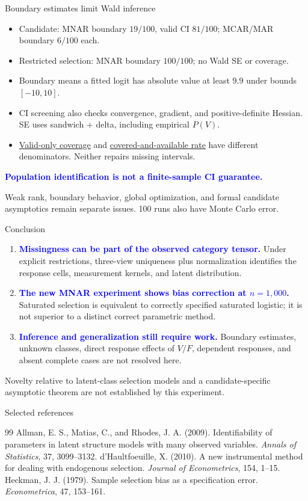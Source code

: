 \documentclass[aspectratio=169,10pt]{beamer}
\newcommand{\slidebody}{\fontsize{10.6pt}{12.6pt}\selectfont}
\renewcommand{\footnotesize}{\slidebody}
\newcommand{\bluekey}[1]{\textcolor{Blue}{\textbf{#1}}}
\newcommand{\term}[1]{\underline{#1}}
\begin{document}
\begin{frame}{Boundary estimates limit Wald inference}
\begin{itemize}
\setlength{\itemsep}{.65em}
\item Candidate: MNAR boundary $19/100$, valid CI $81/100$;
MCAR/MAR boundary $6/100$ each.
\item Restricted selection: MNAR boundary $100/100$; no Wald SE or coverage.
\item Boundary means a fitted logit has absolute value at least $9.9$
under bounds $[-10,10]$.
\item CI screening also checks convergence, gradient, and positive-definite Hessian.
SE uses sandwich + delta, including empirical $P(V)$.
\item \term{Valid-only coverage} and \term{covered-and-available rate}
have different denominators. Neither repairs missing intervals.
\end{itemize}
\medskip
\bluekey{Population identification is not a finite-sample CI guarantee.}
\par\smallskip
Weak rank, boundary behavior, global optimization, and formal candidate
asymptotics remain separate issues. 100 runs also have Monte Carlo error.
\end{frame}

\begin{frame}{Conclusion}
\begin{enumerate}
\setlength{\itemsep}{.85em}
\item \bluekey{Missingness can be part of the observed category tensor.}
Under explicit restrictions, three-view uniqueness plus normalization
identifies the response cells, measurement kernels, and latent distribution.
\item \bluekey{The new MNAR experiment shows bias correction at $n=1{,}000$.}
Saturated selection is equivalent to correctly specified saturated logistic;
it is not superior to a distinct correct parametric method.
\item \bluekey{Inference and generalization still require work.}
Boundary estimates, unknown classes, direct response effects of $V/F$,
dependent responses, and absent complete cases are not resolved here.
\end{enumerate}
\medskip
Novelty relative to latent-class selection models and a candidate-specific
asymptotic theorem are not established by this experiment.
\end{frame}

\begin{frame}{Selected references}
\footnotesize
\begin{thebibliography}{99}
 Allman, E. S., Matias, C., and Rhodes, J. A. (2009). Identifiability of parameters in latent structure models with many observed variables. \emph{Annals of Statistics}, 37, 3099--3132.
 d'Haultfoeuille, X. (2010). A new instrumental method for dealing with endogenous selection. \emph{Journal of Econometrics}, 154, 1--15.
 Heckman, J. J. (1979). Sample selection bias as a specification error. \emph{Econometrica}, 47, 153--161.
\end{thebibliography}
\end{frame}
\end{document}
